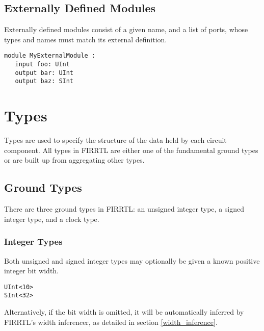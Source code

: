 \documentclass[12pt]{article}
\begin{document}
\subsection{Externally Defined Modules}
Externally defined modules consist of a given name, and a list of ports, whose types and names must match its external definition.

\begin{verbatim}
module MyExternalModule :
   input foo: UInt
   output bar: UInt
   output baz: SInt
\end{verbatim}  




\section{Types}

Types are used to specify the structure of the data held by each circuit component. All types in FIRRTL are either one of the fundamental ground types or are built up from aggregating other types. 

\subsection{Ground Types}

There are three ground types in FIRRTL: an unsigned integer type, a signed integer type, and a clock type.

\subsubsection{Integer Types}

Both unsigned and signed integer types may optionally be given a known positive integer bit width.

\begin{verbatim}
UInt<10>
SInt<32>
\end{verbatim}  

Alternatively, if the bit width is omitted, it will be automatically inferred by FIRRTL's width inferencer, as detailed in section \ref{width_inference}.
\end{document}
